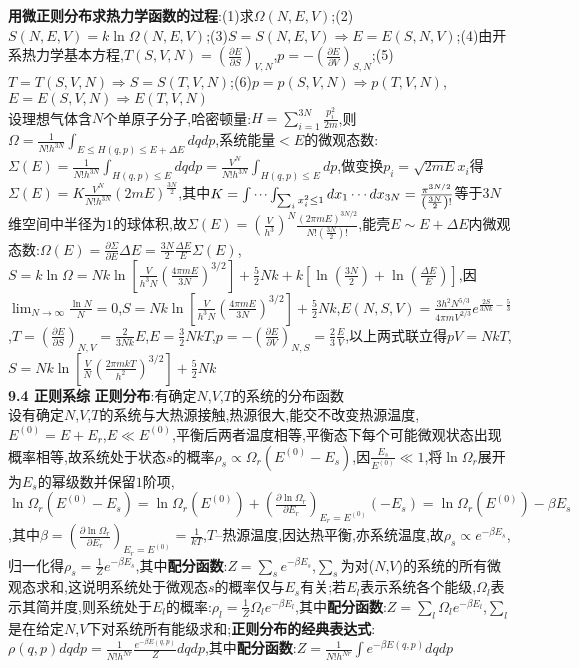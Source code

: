 \documentclass[10pt,a4paper]{article}
\begin{document}
\begin{multicols}{2}
\textbf{用微正则分布求热力学函数的过程}:(1)求$\Omega(N,E,V)$;(2)$S(N,E,V)=k\ln\Omega(N,E,V)$;(3)$S=S(N,E,V)\Rightarrow E=E(S,N,V)$;(4)由开系热力学基本方程,$T(S,V,N)=\left(\frac{\partial E}{\partial S}\right)_{V,N}$,$p=-\left(\frac{\partial E}{\partial V}\right)_{S,N}$;(5)$T=T(S,V,N)\Rightarrow S=S(T,V,N)$;(6)$p=p(S,V,N)\Rightarrow p(T,V,N)$,$E=E(S,V,N)\Rightarrow E(T,V,N)$\\
设理想气体含$N$个单原子分子,哈密顿量:$H=\sum_{i=1}^{3N}\frac{p_i^2}{2m}$,则$\Omega=\frac{1}{N!h^{3N}}\int_{E\leq H(q,p)\leq E+\Delta E}dqdp$,系统能量$<E$的微观态数:$\Sigma(E)=\frac{1}{N!h^{3N}}\int_{H(q,p)\leq E}dqdp=\frac{V^N}{N!h^{3N}}\int_{H(q,p)\leq E}dp$,做变换$p_i=\sqrt{2mE}x_i$得$\Sigma(E)=K\frac{V^N}{N!h^{3N}}(2mE)^{\frac{3N}{2}}$,其中$K=\idotsint_{\sum_ix_i^2\leq 1}dx_1\cdots dx_{3N}=\frac{\pi^{3N/2}}{\left(\frac{3N}{2}\right)!}$等于$3N$维空间中半径为$1$的球体积,故$\Sigma(E)=\left(\frac{V}{h^3}\right)^N\frac{(2\pi mE)^{3N/2}}{N!\left(\frac{3N}{2}\right)!}$,能壳$E\sim E+\Delta E$内微观态数:$\Omega(E)=\frac{\partial\Sigma}{\partial E}\Delta E=\frac{3N}{2}\frac{\Delta E}{E}\Sigma(E)$,$S=k\ln\Omega=Nk\ln\left[\frac{V}{h^3N}\left(\frac{4\pi mE}{3N}\right)^{3/2}\right]+\frac{5}{2}Nk+k\left[\ln\left(\frac{3N}{2}\right)+\ln\left(\frac{\Delta E}{E}\right)\right]$,因$\lim_{N\rightarrow\infty}\frac{\ln N}{N}=0$,$S=Nk\ln\left[\frac{V}{h^3N}\left(\frac{4\pi mE}{3N}\right)^{3/2}\right]+\frac{5}{2}Nk$,$E(N,S,V)=\frac{3h^2N^{5/3}}{4\pi mV^{2/3}}e^{\frac{2S}{3Nk}-\frac{5}{3}}$,$T=\left(\frac{\partial E}{\partial S}\right)_{N,V}=\frac{2}{3Nk}E$,$E=\frac{3}{2}NkT$,$p=-\left(\frac{\partial E}{\partial V}\right)_{N,S}=\frac{2}{3}\frac{E}{V}$,以上两式联立得$pV=NkT$,$S=Nk\ln\left[\frac{V}{N}\left(\frac{2\pi mkT}{h^2}\right)^{3/2}\right]+\frac{5}{2}Nk$\\
\textbf{9.4 正则系综}
\textbf{正则分布}:有确定$N$,$V$,$T$的系统的分布函数\\
设有确定$N$,$V$,$T$的系统与大热源接触,热源很大,能交不改变热源温度,$E^{(0)}=E+E_r$,$E\ll E^{(0)}$,平衡后两者温度相等,平衡态下每个可能微观状态出现概率相等,故系统处于状态$s$的概率$\rho_s\propto\Omega_r(E^{(0)}-E_s)$,因$\frac{E_s}{E^{(0)}}\ll1$,将$\ln\Omega_r$展开为$E_s$的幂级数并保留$1$阶项,$\ln\Omega_r(E^{(0)}-E_s)=\ln\Omega_r(E^{(0)})+\left(\frac{\partial\ln\Omega_r}{\partial E_r}\right)_{E_r=E^{(0)}}(-E_s)=\ln\Omega_r(E^{(0)})-\beta E_s$,其中$\beta=\left(\frac{\partial\ln\Omega_r}{\partial E_r}\right)_{E_r=E^{(0)}}=\frac{1}{kT}$,$T$--热源温度,因达热平衡,亦系统温度,故$\rho_s\propto e^{-\beta E_s}$,归一化得$\rho_s=\frac{1}{Z}e^{-\beta E_s}$,其中\textbf{配分函数}:$Z=\sum_se^{-\beta E_s}$,$\sum_s$为对($N$,$V$)的系统的所有微观态求和,这说明系统处于微观态$s$的概率仅与$E_s$有关;若$E_l$表示系统各个能级,$\Omega_l$表示其简并度,则系统处于$E_l$的概率:$\rho_l=\frac{1}{Z}\Omega_le^{-\beta E_l}$,其中\textbf{配分函数}:$Z=\sum_l\Omega_le^{-\beta E_l}$,$\sum_l$是在给定$N$,$V$下对系统所有能级求和;\textbf{正则分布的经典表达式}:$\rho(q,p)dqdp=\frac{1}{N!h^{Nr}}\frac{e^{-\beta E(q,p)}}{Z}dqdp$,其中\textbf{配分函数}:$Z=\frac{1}{N!h^{Nr}}\int e^{-\beta E(q,p)}dqdp$\\

\end{multicols}
\end{document}
